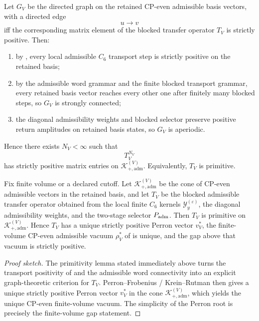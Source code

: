 \begin{tcolorbox}[colback=tfptblue!2, colframe=tfptblue!40, breakable,
    title={Primitivity lemma underlying Block 2}, colbacktitle=tfptblue!60]
Let $G_V$ be the directed graph on the retained CP-even admissible basis vectors, with a directed
edge
\[
u\to v
\]
iff the corresponding matrix element of the blocked transfer operator $T_V$ is strictly positive.
Then:
\begin{enumerate}[label=(\roman*), leftmargin=1.5em, topsep=3pt, itemsep=2pt]
    \item by , every local admissible $C_6$ transport step is
    strictly positive on the retained basis;
    \item by the admissible word grammar and the finite blocked transport grammar, every retained
    basis vector reaches every other one after finitely many blocked steps, so $G_V$ is strongly
    connected;
    \item the diagonal admissibility weights and blocked selector preserve positive return
    amplitudes on retained basis states, so $G_V$ is aperiodic.
\end{enumerate}
Hence there exists $N_V<\infty$ such that
\[
T_V^{N_V}
\]
has strictly positive matrix entries on $\mathcal K_{+,\mathrm{adm}}^{(V)}$. Equivalently, $T_V$
is primitive.
\end{tcolorbox}

\begin{theorem}
\label{thm:cp-even-vacuum-uniqueness}
Fix finite volume or a declared cutoff. Let $\mathcal K_{+,\mathrm{adm}}^{(V)}$ be the cone of
CP-even admissible vectors in the retained basis, and let $T_V$ be the blocked admissible
transfer operator obtained from the local finite $C_6$ kernels
$\mathcal Y_y^{(\varepsilon)}$, the diagonal admissibility weights, and the two-stage selector
$P_{\mathrm{adm}}$. Then $T_V$ is primitive on $\mathcal K_{+,\mathrm{adm}}^{(V)}$. Hence $T_V$ has a unique
strictly positive Perron vector $v_V^\ast$, the finite-volume CP-even admissible vacuum
$\rho^\ast_V$ of  is unique, and the gap above that
vacuum is strictly positive.
\end{theorem}

\begin{proof}[Proof sketch]
The primitivity lemma stated immediately above turns the transport positivity of
 and the admissible word connectivity into an explicit
graph-theoretic criterion for $T_V$. Perron--Frobenius / Krein--Rutman then gives a unique
strictly positive Perron vector $v_V^\ast$ in the cone
$\mathcal K_{+,\mathrm{adm}}^{(V)}$, which yields the unique CP-even finite-volume vacuum. The
simplicity of the Perron root is precisely the finite-volume gap statement.
\end{proof}

